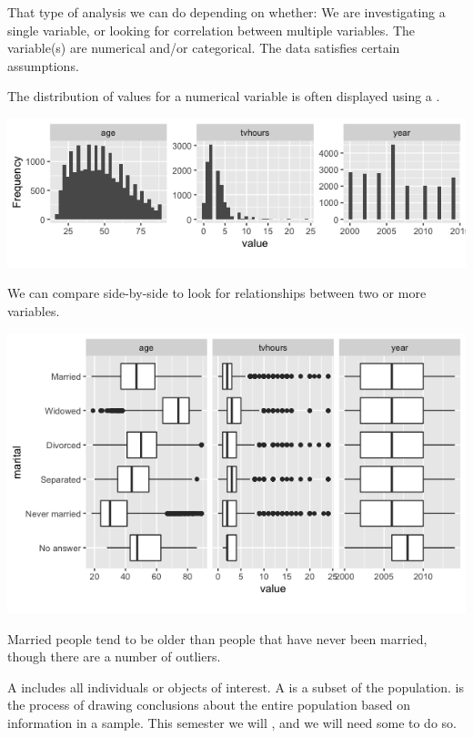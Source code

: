 \clearpage


That type of analysis we can do depending on whether:
\bi
\ii We are investigating a single variable, or looking for correlation between multiple variables.
\ii The variable(s) are numerical and/or categorical.
\ii The data satisfies certain assumptions.
\ei

The distribution of values for a numerical variable is often displayed using a \textbf{}.


\includegraphics[width=7in]{01/fig-gss-histos.png}

We can compare side-by-side \textbf{} to look for relationships between two or more variables.

\includegraphics[width=7in]{01/fig-plot-boxplots.png}

\bbox
Married people tend to be older than people that have never been married, though there are a number of outliers.
\ebox

\clearpage


\bbox
\bi
\ii A \textbf{} includes all individuals or objects of interest.
\ii A \textbf{} is a subset of the population.
\ii \textbf{} is the process of drawing conclusions about the entire population based on information in a sample.
\ii This semester we will \textbf{}, and we will need some \textbf{} to do so.
\ei
\ebox

